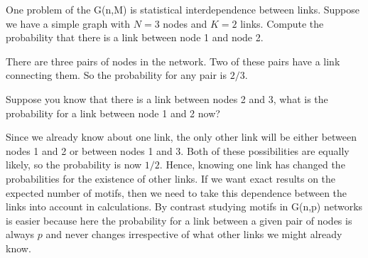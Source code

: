 One problem of the G(n,M) is statistical interdependence between links. Suppose we have a simple graph with $N=3$ nodes and $K=2$ links. 
\subquestion
Compute the probability that there is a link between node 1 and node 2.

\solution
There are three pairs of nodes in the network. Two of these pairs have a link connecting them. So the probability for any pair is $2/3$. 

\subquestion 
Suppose you know that there is a link between nodes 2 and 3, what is the probability for a link between node 1 and 2 now?

\solution
Since we already know about one link, the only other link will be either between nodes 1 and 2 or between nodes 1 and 3. Both of these possibilities are equally likely, so the probability is now $1/2$. Hence, knowing one link has changed the probabilities for the existence of other links. If we want exact results on the expected number of motifs, then we need to take this dependence between the links into account in calculations. By contrast studying motifs in G(n,p) networks is easier because here the probability for a link between a given pair of nodes is always $p$ and never changes irrespective of what other links we might already know.  
